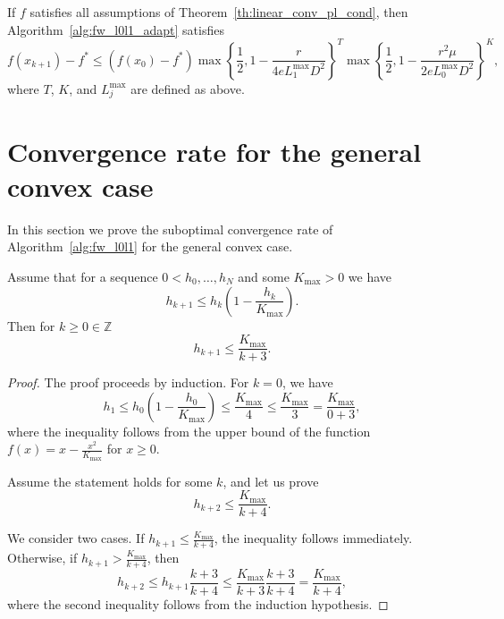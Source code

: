\documentclass[runningheads]{llncs}
\begin{document}
	\begin{corollary}
		If $f$ satisfies all assumptions of Theorem~\ref{th:linear_conv_pl_cond}, then Algorithm~\ref{alg:fw_l0l1_adapt} satisfies
		\begin{equation*}
			f(x_{k+1}) - f^*
			\leq (f(x_0) - f^*)
			\max\left\lbrace \frac{1}{2}, 1 - \frac{r}{4 e L_1^{\max} D^2} \right\rbrace ^T
			\max\left\lbrace \frac{1}{2}, 1 - \frac{r^2 \mu}{2 e L_0^{\max} D^2} \right\rbrace ^K,
		\end{equation*}
		where $T$, $K$, and $L_j^{\max}$ are defined as above.
	\end{corollary}
	
	\section{Convergence rate for the general convex case}
	
	In this section we prove the suboptimal convergence rate of Algorithm~\ref{alg:fw_l0l1} for the general convex case.
	
	\begin{lemma}\label{lemma:subopt_rate}
		Assume that for a sequence $0 < h_0, \ldots, h_N$ and some $K_{\text{max}} > 0$ we have
		\begin{equation*}
			h_{k+1} \leq h_k \left( 1 - \frac{h_k}{K_{\text{max}}} \right).
		\end{equation*}
		Then for $k \geq 0 \in \mathbb{Z}$
		\begin{equation*}
			h_{k+1} \leq \frac{K_{\text{max}}}{k + 3}.
		\end{equation*}
	\end{lemma}
	
	\begin{proof}
		The proof proceeds by induction. For $k = 0$, we have
		\begin{equation*}
			h_1 \leq h_0 \left( 1 - \frac{h_0}{K_{\text{max}}} \right)
			\leq \frac{K_{\text{max}}}{4} \leq \frac{K_{\text{max}}}{3} = \frac{K_{\text{max}}}{0 + 3},
		\end{equation*}
		where the inequality follows from the upper bound of the function $f(x) = x - \frac{x^2}{K_{\text{max}}}$ for $x \geq 0$.
		
		Assume the statement holds for some $k$, and let us prove
		\begin{equation*}
			h_{k+2} \leq \frac{K_{\text{max}}}{k + 4}.
		\end{equation*}
		
		We consider two cases.  
		If $h_{k+1} \leq \frac{K_{\text{max}}}{k + 4}$, the inequality follows immediately.  
		Otherwise, if $h_{k+1} > \frac{K_{\text{max}}}{k + 4}$, then
		\begin{equation*}
			h_{k+2} \leq h_{k+1} \frac{k + 3}{k + 4} \leq \frac{K_{\text{max}}}{k + 3} \frac{k + 3}{k + 4} = \frac{K_{\text{max}}}{k + 4},
		\end{equation*}
		where the second inequality follows from the induction hypothesis.
	\end{proof}
	
\end{document}
